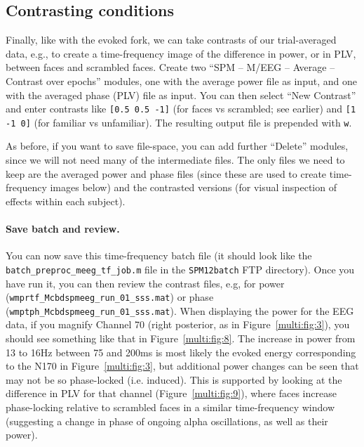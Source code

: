 \subsection{Contrasting conditions}

Finally, like with the evoked fork, we can take contrasts of our trial-averaged data, e.g., to create a time-frequency image of the difference in power, or in PLV, between faces and scrambled faces. Create two ``SPM -- M/EEG -- Average -- Contrast over epochs'' modules, one with the average power file as input, and one with the averaged phase (PLV) file as input. You can then select ``New Contrast'' and enter contrasts like \texttt{[0.5 0.5 -1]} (for faces vs scrambled; see earlier) and \texttt{[1 -1 0]} (for familiar vs unfamiliar). The resulting output file is prepended with \texttt{w}.

As before, if you want to save file-space, you can add further ``Delete'' modules, since we will not need many of the intermediate files. The only files we need to keep are the averaged power and phase files (since these are used to create time-frequency images below) and the contrasted versions (for visual inspection of effects within each subject).

\paragraph{Save batch and review.}

You can now save this time-frequency batch file (it should look like the \texttt{batch\_preproc\_meeg\_tf\_job.m} file in the \texttt{SPM12batch} FTP directory). Once you have run it, you can then review the contrast files, e.g, for power (\texttt{wmprtf\_Mcbdspmeeg\_run\_01\_sss.mat}) or phase (\texttt{wmptph\_Mcbdspmeeg\_run\_01\_sss.mat}). When displaying the power for the EEG data, if you magnify Channel 70 (right posterior, as in Figure~\ref{multi:fig:3}), you should see something like that in Figure~\ref{multi:fig:8}. The increase in power from 13 to 16Hz between 75 and 200ms is most likely the evoked energy corresponding to the N170 in Figure~\ref{multi:fig:3}, but additional power changes can be seen that may not be so phase-locked (i.e. induced). This is supported by looking at the difference in PLV for that channel (Figure~\ref{multi:fig:9}), where faces increase phase-locking relative to scrambled faces in a similar time-frequency window (suggesting a change in phase of ongoing alpha oscillations, as well as their power).

